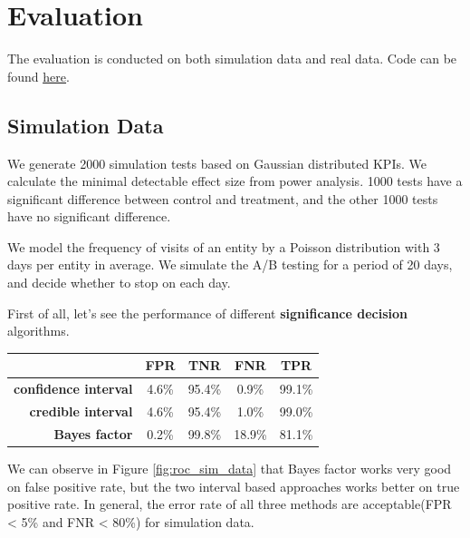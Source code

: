 \documentclass[paper=a4, fontsize=11pt]{scrartcl} %
\numberwithin{equation}{section} %
\numberwithin{figure}{section} %
\numberwithin{table}{section} %
\begin{document}
\section{Evaluation}

The evaluation is conducted on both simulation data and real data. Code can be found \href{https://github.com/shansfolder/ABTestingEarlyStoppingEvaluation}{\underline{here}}.

\subsection{Simulation Data}
We generate 2000 simulation tests based on Gaussian distributed KPIs. We calculate the minimal detectable effect size from power analysis. 1000 tests have a significant difference between control and treatment, and the other 1000 tests have no significant difference. 

We model the frequency of visits of an entity by a Poisson distribution with 3 days per entity in average. We simulate the A/B testing for a period of 20 days, and decide whether to stop on each day.

First of all, let's see the performance of different \textbf{significance decision} algorithms.
\begin{center}
  \begin{tabular}{ | r | c | c | c | c | }
    \hline
    & FPR & TNR & FNR & TPR \\ \hline
    \textbf{confidence interval} & 4.6\% & 95.4\% & 0.9\% & 99.1\% \\ \hline
    \textbf{credible interval} & 4.6\% & 95.4\% & 1.0\% & 99.0\% \\ \hline
    \textbf{Bayes factor} & 0.2\% & 99.8\% & 18.9\% & 81.1\%\\
    \hline
  \end{tabular}
\end{center}

We can observe in Figure \ref{fig:roc_sim_data} that Bayes factor works very good on false positive rate, but the two interval based approaches works better on true positive rate. In general, the error rate of all three methods are acceptable(FPR < 5\% and FNR < 80\%) for simulation data. 
\end{document}
